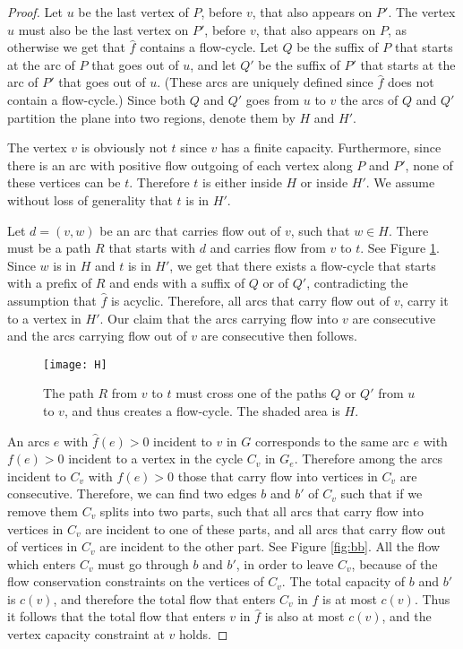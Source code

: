 \documentclass[a4paper,11pt]{article}
\begin{document}
\begin{proof}
Let $u$ be the last vertex of $P$, before $v$, that also
appears on $P'$. The vertex $u$ must also be the last vertex on $P'$,
before $v$,
that also appears on $P$, as otherwise we get that $\hat{f}$ contains a
flow-cycle.
Let $Q$ be the suffix of $P$ that starts at the arc of $P$ that
goes out of $u$, and let $Q'$ be the suffix of $P'$ that starts at
the arc of $P'$ that goes out of $u$. (These arcs are uniquely
defined since $\hat{f}$ does not contain a flow-cycle.) Since both
$Q$ and $Q'$ goes from $u$ to $v$ the arcs of $Q$ and $Q'$ partition
the plane into two regions, denote them by $H$ and $H'$.

The vertex $v$ is obviously not $t$ since $v$ has a finite capacity.
Furthermore, since there is an arc with positive flow outgoing of
each vertex along $P$ and $P'$, none of these vertices can be $t$. Therefore $t$ is
either inside $H$ or inside $H'$. We assume without loss of generality that
$t$ is in $H'$.

 Let $d =
(v, w)$ be an arc that carries flow out of $v$, such that $w \in
H$. There must be a path $R$ that starts with $d$ and carries flow
from $v$ to $t$. See Figure \ref{fig:H}. Since $w$ is in $H$ and
$t$ is in $H'$, we get that there exists a flow-cycle that starts
with a prefix of $R$ and ends with a suffix of $Q$ or of $Q'$,
contradicting  the assumption that $\hat{f}$ is acyclic. Therefore,
all arcs that carry flow out of $v$, carry it to a vertex in $H'$.
Our claim that the arcs carrying flow into
$v$ are consecutive and the arcs carrying flow out of $v$ are
consecutive then follows.

\begin{figure}
    \centering
    \texttt{[image: H]}
    \caption{The path $R$ from $v$ to $t$ must cross one of the paths $Q$ or $Q'$ from $u$ to $v$, and thus creates a flow-cycle. The shaded area is $H$.}
    \label{fig:H}
\end{figure}

An arcs $e$ with $\hat{f}(e) > 0$ incident to $v$ in $G$ corresponds to the same
arc $e$ with $f(e) > 0$ incident to a vertex in the cycle $C_v$ in
$G_e$. Therefore among the arcs incident to $C_v$ with $f(e) > 0 $ those
that carry flow into vertices in $C_v$ are consecutive.
 Therefore,
we can find two edges $b$ and $b'$ of $C_v$ such that if we remove
them $C_v$ splits into two parts, such that all arcs that carry flow
into vertices in $C_v$ are incident to one of these parts, and all
arcs that carry flow out of vertices in $C_v$ are incident to the
other part.
 See
Figure \ref{fig:bb}. All the flow which enters $C_v$ must go through
$b$ and $b'$, in order to leave $C_v$, because of the flow conservation
constraints on the vertices of $C_v$.
The total capacity of $b$ and $b'$ is $c(v)$,
and therefore the total flow that enters $C_v$ in $f$ is at most
$c(v)$. Thus it follows that the total flow that enters $v$ in
$\hat{f}$ is also at most $c(v)$, and the vertex capacity constraint
at $v$ holds.
\end{proof}
\end{document}
